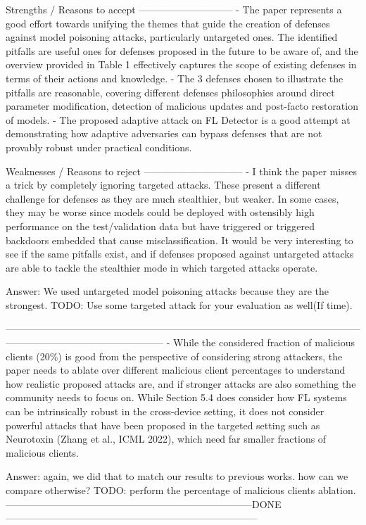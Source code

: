 Strengths / Reasons to accept
-----------------------------
- The paper represents a good effort towards unifying the themes that guide the creation of defenses against model poisoning attacks, particularly untargeted ones. The identified pitfalls are useful ones for defenses proposed in the future to be aware of, and the overview provided in Table 1 effectively captures the scope of existing defenses in terms of their actions and knowledge.
- The 3 defenses chosen to illustrate the pitfalls are reasonable, covering different defenses philosophies around direct parameter modification, detection of malicious updates and post-facto restoration of models.
- The proposed adaptive attack on FL Detector is a good attempt at demonstrating how adaptive adversaries can bypass defenses that are not provably robust under practical conditions.

Weaknesses / Reasons to reject
------------------------------
- I think the paper misses a trick by completely ignoring targeted attacks. These present a different challenge for defenses as they are much stealthier, but weaker. In some cases, they may be worse since models could be deployed with ostensibly high performance on the test/validation data but have triggered or triggered backdoors embedded that cause misclassification. It would be very interesting to see if the same pitfalls exist, and if defenses proposed against untargeted attacks are able to tackle the stealthier mode in which targeted attacks operate.

Answer: We used untargeted model poisoning attacks because they are the strongest.
TODO: Use some targeted attack for your evaluation as well(If time).


------------------------------------------------------------------------------------------------------------------------------------------------------------
- While the considered fraction of malicious clients (20\%) is good from the perspective of considering strong attackers, the paper needs to ablate over different malicious client percentages to understand how realistic proposed attacks are, and if stronger attacks are also something the community needs to focus on. While Section 5.4 does consider how FL systems can be intrinsically robust in the cross-device setting, it does not consider powerful attacks that have been proposed in the targeted setting such as Neurotoxin (Zhang et al., ICML 2022), which need far smaller fractions of malicious clients.

Answer: again, we did that to match our results to previous works. how can we compare otherwise?
TODO: perform the percentage of malicious clients ablation.
---------------------------------------------------------------------------DONE-----------------------------------------------------------------------------


